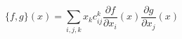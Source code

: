 \begin{equation}
            \label{eq:LiePoisson}
            \{f, g\} (x) = \sum_{i,j,k} x_k c^k_{ij} 
            \frac{\partial f}{\partial x_i}(x)
            \frac{\partial g}{\partial x_j}(x)
        \end{equation}

